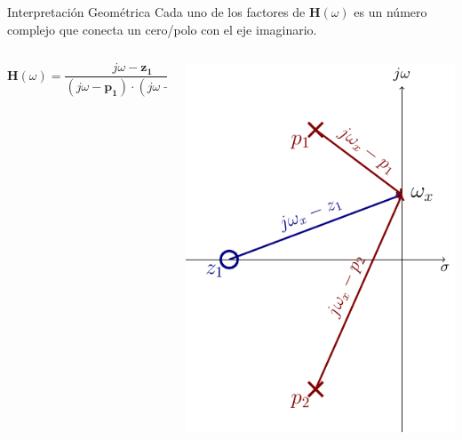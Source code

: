 \documentclass[aspectratio=169, usenames,svgnames,dvipsnames]{beamer}
\newcommand{\fasor}[1]{\mathbf{#1}(\omega)}
\begin{document}
\begin{frame}[label={sec:orgd7ac71b}]{Interpretación Geométrica}
Cada uno de los factores de \(\fasor{H}\) es un número complejo que conecta un cero/polo con el eje imaginario.
\begin{columns}
\begin{column}[c]{0.3\columnwidth}
\[
\fasor{H} = \frac{j\omega - \mathbf{z_1}}{(j\omega - \mathbf{p_1}) \cdot (j\omega - \mathbf{p_2})}
\]
\end{column}
\begin{column}[c]{0.7\columnwidth}
\begin{center}
\includegraphics[height=0.65\textheight]{../figs/InterpretacionGeometrica.pdf}
\end{center}
\end{column}
\end{columns}
\end{frame}
\end{document}
